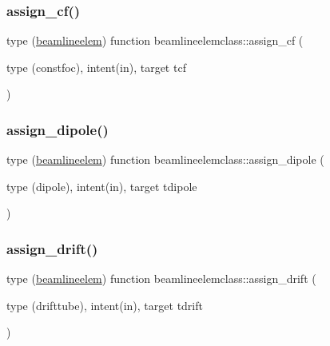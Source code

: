 \subsubsection{\texorpdfstring{assign\_cf()}{assign\_cf()}}
{\footnotesize\ttfamily type (\mbox{\hyperlink{namespacebeamlineelemclass_structbeamlineelemclass_1_1beamlineelem}{beamlineelem}}) function beamlineelemclass\+::assign\+\_\+cf (\begin{DoxyParamCaption}\item[{type (constfoc), intent(in), target}]{tcf }\end{DoxyParamCaption})}

\mbox{\label{namespacebeamlineelemclass_ab472ce183e8b1faa6f40c494a9d8bc03}} 
\subsubsection{\texorpdfstring{assign\_dipole()}{assign\_dipole()}}
{\footnotesize\ttfamily type (\mbox{\hyperlink{namespacebeamlineelemclass_structbeamlineelemclass_1_1beamlineelem}{beamlineelem}}) function beamlineelemclass\+::assign\+\_\+dipole (\begin{DoxyParamCaption}\item[{type (dipole), intent(in), target}]{tdipole }\end{DoxyParamCaption})}

\mbox{\label{namespacebeamlineelemclass_a667b68ced2d4a0e5cd691d7d472a59ae}} 
\subsubsection{\texorpdfstring{assign\_drift()}{assign\_drift()}}
{\footnotesize\ttfamily type (\mbox{\hyperlink{namespacebeamlineelemclass_structbeamlineelemclass_1_1beamlineelem}{beamlineelem}}) function beamlineelemclass\+::assign\+\_\+drift (\begin{DoxyParamCaption}\item[{type (drifttube), intent(in), target}]{tdrift }\end{DoxyParamCaption})}


